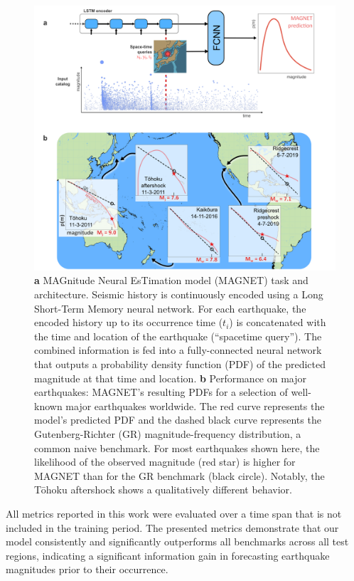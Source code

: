 \documentclass[pdflatex]{sn-jnl}
\begin{document}
\begin{figure}[h!]
	\centering
        \includegraphics[width=1\textwidth]{figures/intro_fig.png}
	\caption{\textbf{a} MAGnitude Neural EsTimation model (MAGNET) task and architecture. Seismic history is continuously encoded using a Long Short-Term Memory neural network. For each earthquake, the encoded history up to its occurrence time ($t_i$) is concatenated with the time and location of the earthquake (``spacetime query''). The combined information is fed into a fully-connected neural network that outputs a probability density function (PDF) of the predicted magnitude at that time and location. \textbf{b} Performance on major earthquakes: MAGNET's resulting PDFs for a selection of well-known major earthquakes worldwide. The red curve represents the model's predicted PDF and the dashed black curve represents the Gutenberg-Richter (GR) magnitude-frequency distribution, a common naive benchmark. For most earthquakes shown here, the likelihood of the observed magnitude (red star) is higher for MAGNET than for the GR benchmark (black circle). Notably, the Tōhoku aftershock shows a qualitatively different behavior.
    }
\label{fig:intro_fig}
\end{figure}

All metrics reported in this work were evaluated over a time span that is not included in the training period. The presented metrics demonstrate that our model consistently and significantly outperforms all benchmarks across all test regions, indicating a significant information gain in forecasting earthquake magnitudes prior to their occurrence.
\end{document}
